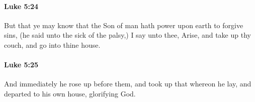 		\paragraph{Luke 5:24} %
			\label{LUKE-5-24}

			But that ye may know that the Son of man hath power upon earth to forgive sins, (he said unto the sick of the palsy,) I say unto thee, Arise, and take up thy couch, and go into thine house.

			\begin{framed}
			\scriptsize
				\begin{compactdesc}
					\item[SBLG] 
				\end{compactdesc}
			\end{framed}

		\paragraph{Luke 5:25} %
			\label{LUKE-5-25}

			And immediately he rose up before them, and took up that whereon he lay, and departed to his own house, glorifying God.

